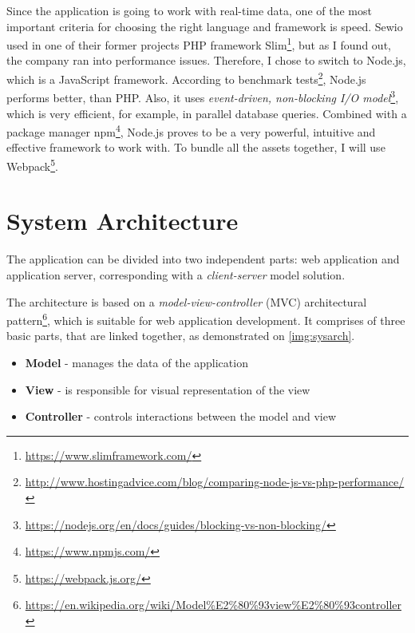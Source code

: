 Since the application is going to work with real-time data, one of the most important criteria for choosing the right language and framework is speed. Sewio used in one of their former projects PHP framework Slim\footnote{\url{https://www.slimframework.com/}}, but as I found out, the company ran into performance issues. Therefore, I chose to switch to Node.js, which is a JavaScript framework. According to benchmark tests\footnote{\url{http://www.hostingadvice.com/blog/comparing-node-js-vs-php-performance/}}, Node.js performs better, than PHP. Also, it uses \textit{event-driven, non-blocking I/O model}\footnote{\url{https://nodejs.org/en/docs/guides/blocking-vs-non-blocking/}}, which is very efficient, for example, in parallel database queries. Combined with a package manager npm\footnote{\url{https://www.npmjs.com/}}, Node.js proves to be a very powerful, intuitive and effective framework to work with. To bundle all the assets together, I will use Webpack\footnote{\url{https://webpack.js.org/}}.

\section{System Architecture}
The application can be divided into two independent parts: web application and application server, corresponding with a \textit{client-server} model solution.

The architecture is based on a \textit{model-view-controller} (MVC) architectural pattern\footnote{\url{https://en.wikipedia.org/wiki/Model\%E2\%80\%93view\%E2\%80\%93controller}}, which is suitable for web application development. It comprises of three basic parts, that are linked together, as demonstrated on \ref{img:sysarch}.

\begin{itemize}
\item \textbf{Model} - manages the data of the application
\item \textbf{View} - is responsible for visual representation of the view
\item \textbf{Controller} - controls interactions between the model and view
\end{itemize}

